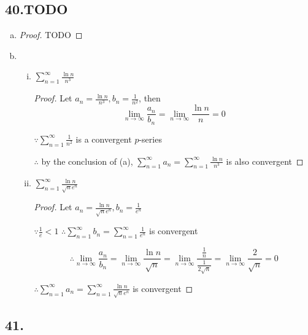 \documentclass{article}
\begin{document}
    \subsection*{40.TODO}

    \begin{enumerate}[(a)]
        \item \begin{proof}
            TODO
        \end{proof}

        \item 
        \begin{enumerate}[(i)]
            \item $\sum_{n=1}^\infty \frac{\ln n}{n^3}$
            \begin{proof}

            Let $a_n = \frac{\ln n}{n^3}, b_n = \frac{1}{n^2}$, then $$\lim_{n\to\infty}\frac{a_n}{b_n} = \lim_{n\to\infty}\frac{\ln n}{n} = 0$$

            $\because \sum_{n=1}^\infty \frac{1}{n^2}$ is a convergent $p$-series

            $\therefore$ by the conclusion of (a), $\sum_{n=1}^\infty a_n = \sum_{n=1}^\infty \frac{\ln n}{n^3}$ is also convergent
            \end{proof}
            \item $\sum_{n=1}^\infty \frac{\ln n}{\sqrt n e^n}$
            \begin{proof}

            Let $a_n = \frac{\ln n}{\sqrt n e^n}, b_n = \frac{1}{e^n}$

            $\because \frac 1 e < 1$ $\therefore \sum_{n=1}^\infty b_n = \sum_{n=1}^\infty \frac{1}{e^n}$ is convergent

            $$\therefore \lim_{n\to \infty}\frac{a_n}{b_n} = \lim_{n\to\infty}\frac{\ln n}{\sqrt n} = \lim_{n\to\infty}\frac{\frac 1 n}{\frac{1}{2\sqrt n}} = \lim_{n\to\infty}\frac{2}{\sqrt n} = 0$$

            $\therefore \sum_{n=1}^\infty a_n = \sum_{n=1}^\infty \frac{\ln n}{\sqrt n e^n}$ is convergent
                
            \end{proof}

        \end{enumerate}

    \end{enumerate}

    \subsection*{41.}
\end{document}
